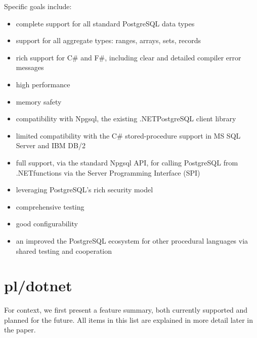 \documentclass[sigconf,techreport,authorversion,nonacm]{acmart}
\newcommand{\dotnet}{.NET}
\begin{document}
Specific goals include:
\begin{itemize}
    \item complete support for all standard PostgreSQL data types
    \item support for all aggregate types: ranges, arrays, sets, records
    \item rich support for C\# and F\#, including clear and detailed compiler error messages
    \item high performance
    \item memory safety
    \item compatibility with Npgsql, the existing \dotnet PostgreSQL client library
    \item limited compatibility with the C\# stored-procedure support in MS SQL Server and IBM DB/2
    \item full support, via the standard Npgsql API, for calling PostgreSQL from \dotnet functions via the Server Programming Interface (SPI)
    \item leveraging PostgreSQL's rich security model
    \item comprehensive testing
    \item good configurability
    \item an improved the PostgreSQL ecosystem for other procedural languages via shared testing and cooperation
\end{itemize}




\section{pl/dotnet}



For context, we first present a feature summary, both currently
supported and planned for the future. All items in this list are
explained in more detail later in the paper.
\end{document}
